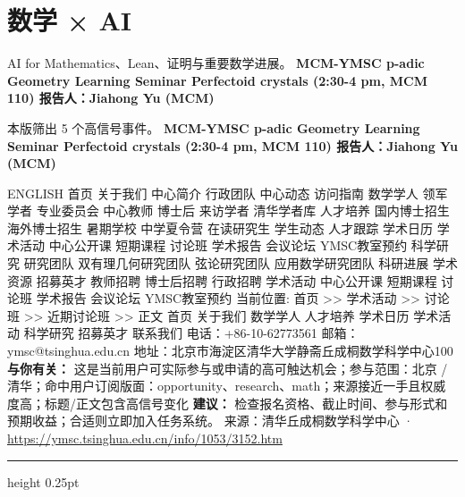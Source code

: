 \documentclass[10.5pt]{ctexart}
\begin{document}
\section*{数学 × AI}
{\color{ormuted} AI for Mathematics、Lean、证明与重要数学进展。}
\vspace{2mm}
{\LARGE\bfseries MCM-YMSC p-adic Geometry Learning Seminar Perfectoid crystals (2:30-4 pm, MCM 110) 报告人：Jiahong Yu (MCM)}\par
\vspace{1mm}
{\color{ormuted} 本版筛出 5 个高信号事件。}
\vspace{3mm}
{\Large\bfseries MCM-YMSC p-adic Geometry Learning Seminar Perfectoid crystals (2:30-4 pm, MCM 110) 报告人：Jiahong Yu (MCM)}\par
ENGLISH 首页 关于我们 中心简介 行政团队 中心动态 访问指南 数学学人 领军学者 专业委员会 中心教师 博士后 来访学者 清华学者库 人才培养 国内博士招生 海外博士招生 暑期学校 中学夏令营 在读研究生 学生动态 人才跟踪 学术日历 学术活动 中心公开课 短期课程 讨论班 学术报告 会议论坛 YMSC教室预约 科学研究 研究团队 双有理几何研究团队 弦论研究团队 应用数学研究团队 科研进展 学术资源 招募英才 教师招聘 博士后招聘 行政招聘 学术活动 中心公开课 短期课程 讨论班 学术报告 会议论坛 YMSC教室预约 当前位置: 首页 >> 学术活动 >> 讨论班 >> 近期讨论班 >> 正文 首页 关于我们 数学学人 人才培养 学术日历 学术活动 科学研究 招募英才 联系我们 电话：+86-10-62773561 邮箱：ymsc@tsinghua.edu.cn 地址：北京市海淀区清华大学静斋丘成桐数学科学中心100
\textbf{与你有关：} 这是当前用户可实际参与或申请的高可触达机会；参与范围：北京 / 清华；命中用户订阅版面：opportunity、research、math；来源接近一手且权威度高；标题/正文包含高信号变化
\textbf{建议：} 检查报名资格、截止时间、参与形式和预期收益；合适则立即加入任务系统。
{\footnotesize\color{ormuted} 来源：清华丘成桐数学科学中心 · \url{https://ymsc.tsinghua.edu.cn/info/1053/3152.htm}}
\vspace{4mm}
\hrule height 0.25pt
\vspace{3mm}
\end{document}
